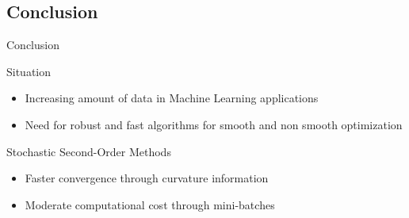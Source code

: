 \documentclass[11pt]{beamer}
\begin{document}
	\subsection{Conclusion}
	\begin{frame}{Conclusion}
		\begin{block}{Situation}
			\begin{itemize}
				\item Increasing amount of data in Machine Learning applications
				\item Need for robust and fast algorithms for smooth and non smooth optimization
			\end{itemize}
		\end{block}
		\begin{block}{Stochastic Second-Order Methods}
			\begin{itemize}
				\item Faster convergence through curvature information
				\item Moderate computational cost through mini-batches
			\end{itemize}
		\end{block}
	\end{frame}
	
	
\end{document}
